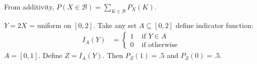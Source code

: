 \documentclass{report}
\begin{document}
From additivity, $P(X \in \mathcal{B}) = \sum_{K \in \mathcal{B}} P_{X}(K)$.

\begin{examples}
    \begin{example}
        $Y = 2X$ = uniform on $[0, 2]$. Take any set $A \subseteq [0, 2]$ define indicator function:
            \begin{align*}
                I_{A}(Y) &= \begin{cases}
                    1                &\text{ if } Y \in A \\
                    0 &\text{ if } \text{otherwise}   
                \end{cases}   
            \end{align*}
        $A = [0, 1]$. Define $Z = I_{A}(Y)$. Then $P_{Z}(1) = .5$ and $P_{Z}(0) = .5$.
    \end{example}
\end{examples}
\end{document}
